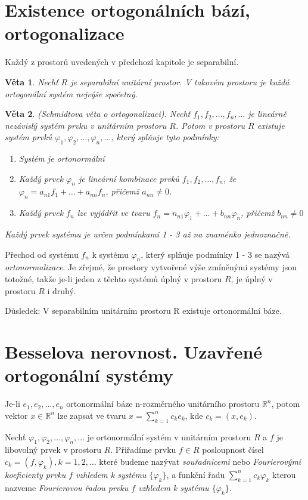 \documentclass[a4paper, 11pt]{report}
\newtheorem{veta}{Věta}[chapter]
\begin{document}
\section{Existence ortogonálních bází, ortogonalizace}
Každý z prostorů uvedených v předchozí kapitole je separabilní.
\begin{veta}
Nechť $R$ je separabilní unitární prostor. V takovém prostoru je každá ortogonální systém nejvýše spočetný.
\end{veta}

\begin{veta}
(Schmidtova věta o ortogonalizaci). Nechť
$f_1, f_2, \dots, f_n, \dots$
je lineárně nezávislý systém prvku v unitárním prostoru $R$. Potom v prostoru $R$ existuje systém prvků
$\varphi_1, \varphi_2, \dots, \varphi_n, \dots$,
který splňuje tyto podmínky:
\begin{enumerate}
	\item Systém je ortonormální
	\item Každý prvek $\varphi_n$ je lineární kombinace prvků $f_1, f_2, \dots, f_n$, že
		$\varphi_n = a_{n1}f_1 + \dots + a_{nn} f_n$, přičemž $a_{nn} \not= 0$.
	\item Každý prvek $f_n$ lze vyjádřit ve tvaru $f_n = n_{n1} \varphi_1 + \dots + b_{nn} \varphi_n$, přičemž $b_{nn} \not= 0$
\end{enumerate}
Každý prvek systému je určen podmínkami 1 - 3 až na znaménko jednoznačně.
\end{veta}

Přechod od systému $f_n$ k systému $\varphi_n$, který splňuje podmínky 1 - 3 se nazývá \emph{ortonormalizace}.
Je zřejmé, že prostory vytvořené výše zmíněnými systémy jsou totožné, takže je-li jeden z těchto systémů úplný v prostoru $R$, je úplný v prostoru $R$ i druhý.

Důsledek: V separabilním unitárním prostoru R existuje ortonormální báze.

\section{Besselova nerovnost. Uzavřené ortogonální systémy}

Je-li $e_1, e_2, \dots, e_n$ ortonormální báze n-rozměrného unitárního prostoru $\mathbb{R}^n$, potom vektor $x \in \mathbb{R}^n$ lze zapsat ve tvaru
$x = \sum\limits_{k=1}^n c_k e_k$, kde $c_k = (x, e_k)$.

Nechť $\varphi_1, \varphi_2, \dots, \varphi_n, \dots$
je ortonormální systém v unitárním prostoru $R$ a $f$ je libovolný prvek v prostoru $R$. Přiřadíme prvku $f \in R$ posloupnost čísel
$c_k = (f, \varphi_k), k = 1, 2, \dots$
které budeme nazývat \emph{souřadnicemi} nebo \emph{Fourierovými koeficienty prvku $f$ vzhledem k systému $\{\varphi_k\}$},
a funkční řadu $\sum\limits_{k=1}^n c_k \varphi_k$ kterou nazveme \emph{Fourierovou řadou prvku $f$ vzhledem k systému $\{\varphi_k\}$}.
\end{document}

